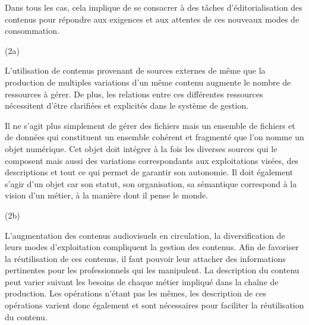\begin{liste}
	Dans tous les cas, cela implique de se consacrer à des tâches d'éditorialisation des contenus pour répondre aux exigences et aux attentes de ces nouveaux modes de consommation.\\


	\item[(2a)]  

	L'utilisation de contenus provenant de sources externes de même que la production de multiples variations d'un même contenu augmente le nombre de ressources à gérer. 
	De plus, les relations entre ces différentes ressources nécessitent d'être clarifiées et explicités dans le système de gestion. 
	
	Il ne s'agit plus simplement de gérer des fichiers mais un ensemble de fichiers et de données qui constituent un ensemble cohérent et fragmenté que l'on nomme un objet numérique. 
	Cet objet doit intégrer à la fois les diverses sources qui le composent mais aussi des variations correspondants aux exploitations visées, des descriptions et tout ce qui permet de garantir son autonomie. 
	Il doit également s'agir d'un objet  car son statut, son organisation, sa sémantique correspond à la vision d'un métier, à la manière dont il pense le monde. 



	\item[(2b)] 

	L'augmentation des contenus audiovisuels en circulation, la diversification de leurs modes d'exploitation compliquent la gestion des contenus.  
	Afin de favoriser la réutilisation de ces contenus, il faut pouvoir leur attacher des informations pertinentes pour les professionnels qui les manipulent. 
	La description du contenu peut varier suivant les besoins de chaque métier impliqué dans la chaîne de production. 
	Les opérations n'étant pas les mêmes, les description de ces opérations varient donc également et sont nécessaires pour faciliter la réutilisation du contenu. 


\end{liste}
